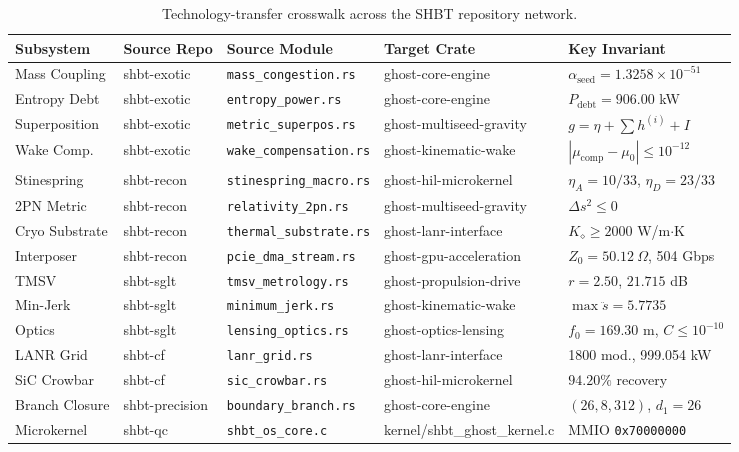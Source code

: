 \documentclass[twocolumn,aps,pra,floatfix,superscriptaddress,10pt]{revtex4-2}
\begin{document}
\begin{table}[t]
\caption{\label{tab:crosswalk}Technology-transfer crosswalk across the SHBT repository network.}
\begin{ruledtabular}
\begin{tabular}{lllll}
Subsystem & Source Repo & Source Module & Target Crate & Key Invariant \\
\hline
Mass Coupling & shbt-exotic & \texttt{mass\_congestion.rs} & ghost-core-engine & $\alpha_{\text{seed}} = 1.3258\times10^{-51}$ \\
Entropy Debt & shbt-exotic & \texttt{entropy\_power.rs} & ghost-core-engine & $P_{\text{debt}} = 906.00$ kW \\
Superposition & shbt-exotic & \texttt{metric\_superpos.rs} & ghost-multiseed-gravity & $g = \eta + \sum h^{(i)} + I$ \\
Wake Comp. & shbt-exotic & \texttt{wake\_compensation.rs} & ghost-kinematic-wake & $|\mu_{\text{comp}}-\mu_0|\le10^{-12}$ \\
Stinespring & shbt-recon & \texttt{stinespring\_macro.rs} & ghost-hil-microkernel & $\eta_A=10/33$, $\eta_D=23/33$ \\
2PN Metric & shbt-recon & \texttt{relativity\_2pn.rs} & ghost-multiseed-gravity & $\Delta s^2 \le 0$ \\
Cryo Substrate & shbt-recon & \texttt{thermal\_substrate.rs} & ghost-lanr-interface & $K_\diamond \ge 2000$ W/m$\cdot$K \\
Interposer & shbt-recon & \texttt{pcie\_dma\_stream.rs} & ghost-gpu-acceleration & $Z_0 = 50.12\ \Omega$, 504 Gbps \\
TMSV & shbt-sglt & \texttt{tmsv\_metrology.rs} & ghost-propulsion-drive & $r = 2.50$, $21.715$ dB \\
Min-Jerk & shbt-sglt & \texttt{minimum\_jerk.rs} & ghost-kinematic-wake & $\max\ddot{s} = 5.7735$ \\
Optics & shbt-sglt & \texttt{lensing\_optics.rs} & ghost-optics-lensing & $f_0 = 169.30$ m, $C \le 10^{-10}$ \\
LANR Grid & shbt-cf & \texttt{lanr\_grid.rs} & ghost-lanr-interface & 1800 mod., 999.054 kW \\
SiC Crowbar & shbt-cf & \texttt{sic\_crowbar.rs} & ghost-hil-microkernel & $94.20\%$ recovery \\
Branch Closure & shbt-precision & \texttt{boundary\_branch.rs} & ghost-core-engine & $(26,8,312)$, $d_1 = 26$ \\
Microkernel & shbt-qc & \texttt{shbt\_os\_core.c} & kernel/shbt\_ghost\_kernel.c & MMIO \texttt{0x70000000} \\

\end{tabular}
\end{ruledtabular}
\end{table}
\end{document}
